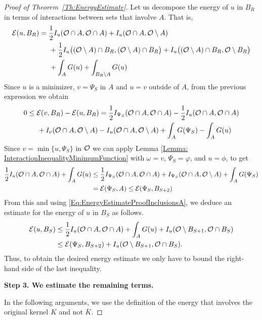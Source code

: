 \begin{proof}[Proof of Theorem~\ref{Th:EnergyEstimate}]
Let us decompose the energy of $u$ in $B_R$ in terms of interactions between sets that involve $A$. That is,
\begin{align*}
\mathcal{E}(u,B_R) &= \frac{1}{2}I_u(\mathcal{O} \cap A, \mathcal{O} \cap A) + I_u(\mathcal{O} \cap A, \mathcal{O} \setminus A) \\
& \hspace{5mm} + \frac{1}{2}I_u\big((\mathcal{O} \setminus A) \cap B_R, (\mathcal{O} \setminus A) \cap B_R\big) + I_u\big((\mathcal{O} \setminus A) \cap B_R, \mathcal{O} \setminus B_R\big) \\
& \hspace{5mm} + \int_A G(u) + \int_{B_R\setminus A} G(u)
\end{align*}
Since $u$ is a minimizer, $v=\Psi_S$ in $A$ and $u=v$ outside of $A$,  from the previous expression we obtain
\begin{align*}
0 &\leq \mathcal{E}(v,B_R)-\mathcal{E}(u,B_R) = \frac{1}{2}I_{\Psi_S}(\mathcal{O} \cap A, \mathcal{O} \cap A) - \frac{1}{2}I_u(\mathcal{O} \cap A, \mathcal{O} \cap A)\\
& \hspace{5mm} + I_v(\mathcal{O} \cap A, \mathcal{O} \setminus A) - I_u(\mathcal{O} \cap A, \mathcal{O} \setminus A) + \int_A G(\Psi_S) - \int_{A} G(u)
\end{align*}
Since $v = \min\{u,\Psi_S\}$ in $\mathcal{O}$ we can apply Lemma \ref{Lemma: InteractionInequalityMinimumFunction} with $\omega = v$, $\Psi_S = \varphi$, and $u= \phi$, to get
\begin{align*}
\frac{1}{2}I_u(\mathcal{O} \cap A, \mathcal{O} \cap A) + \int_{A} G(u) &\leq \frac{1}{2}I_{\Psi_S}(\mathcal{O} \cap A, \mathcal{O} \cap A) + I_{\Psi_S}(\mathcal{O} \cap A, \mathcal{O} \setminus A) + \int_A G(\Psi_S)  \\
&= \mathcal{E}(\Psi_S, A) \leq \mathcal{E}(\Psi_S,B_{S+2})
\end{align*}
From this and using \eqref{Eq:EnergyEstimateProofInclusionsA}, we deduce an estimate for the energy of $u$ in $B_S$ as follows.
\begin{align*}
\mathcal{E}(u,B_S) &\leq \frac{1}{2}I_u(\mathcal{O} \cap A, \mathcal{O} \cap A) + \int_{A} G(u) + I_u(\mathcal{O} \setminus B_{S+1}, \mathcal{O} \cap B_S) \\
& \leq  \mathcal{E}(\Psi_S,B_{S+2}) + I_u(\mathcal{O} \setminus B_{S+1}, \mathcal{O} \cap B_S).
\end{align*}
Thus, to obtain the desired energy estimate we only have to bound the right-hand side of the last inequality.


\textbf{Step 3. We estimate the remaining terms.}

In the following arguments, we use the definition of the energy that involves the original kernel $K$ and not $\overline{K}$.


\end{proof}
